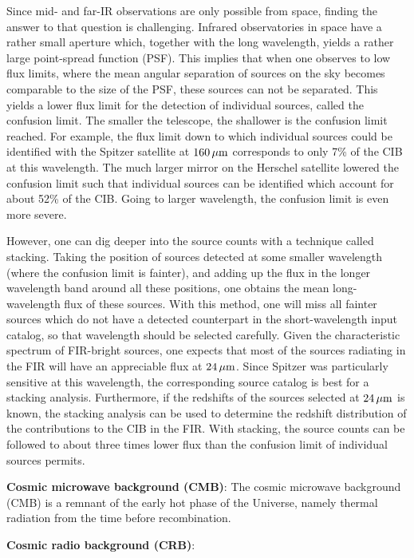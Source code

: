 \documentclass[a4paper,11pt]{article}
\begin{document}
{\noindent}Since mid- and far-IR observations are only possible from space, finding the answer to that question is challenging. Infrared observatories in space have a rather small aperture which, together with the long wavelength, yields a rather large point-spread function (PSF). This implies that when one observes to low flux limits, where the mean angular separation of sources on the sky becomes comparable to the size of the PSF, these sources can not be separated. This yields a lower flux limit for the detection of individual sources, called the confusion limit. The smaller the telescope, the shallower is the confusion limit reached. For example, the flux limit down to which individual sources could be identified with the Spitzer satellite at $160\,\mu{\rm m}$ corresponds to only 7\% of the CIB at this wavelength. The much larger mirror on the Herschel satellite lowered the confusion limit such that individual sources can be identified which account for about 52\% of the CIB. Going to larger wavelength, the confusion limit is even more severe.

{\noindent}However, one can dig deeper into the source counts with a technique called stacking. Taking the position of sources detected at some smaller wavelength (where the confusion limit is fainter), and adding up the flux in the longer wavelength band around all these positions, one obtains the mean long-wavelength flux of these sources. With this method, one will miss all fainter sources which do not have a detected counterpart in the short-wavelength input catalog, so that wavelength should be selected carefully. Given the characteristic spectrum of FIR-bright sources, one expects that most of the sources radiating in the FIR will have an appreciable flux at $24\,\mu{\rm m}$. Since Spitzer was particularly sensitive at this wavelength, the corresponding source catalog is best for a stacking analysis. Furthermore, if the redshifts of the sources selected at $24\,\mu{\rm m}$ is known, the stacking analysis can be used to determine the redshift distribution of the contributions to the CIB in the FIR. With stacking, the source counts can be followed to about three times lower flux than the confusion limit of individual sources permits.

{\noindent}\textbf{Cosmic microwave background (CMB)}: The cosmic microwave background (CMB) is a remnant of the early hot phase of the Universe, namely thermal radiation from the time before recombination. 

{\noindent}\textbf{Cosmic radio background (CRB)}: 
\end{document}

